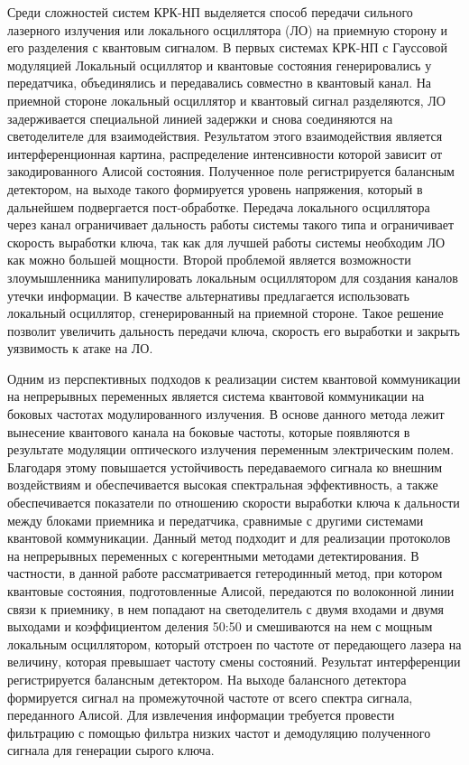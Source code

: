 Среди сложностей систем КРК-НП выделяется способ передачи сильного лазерного излучения или локального осциллятора (ЛО) на приемную сторону и его разделения с квантовым сигналом. В первых системах КРК-НП с Гауссовой модуляцией Локальный осциллятор и квантовые состояния генерировались у передатчика, объединялись и передавались совместно в квантовый канал. На приемной стороне локальный осциллятор и квантовый сигнал разделяются, ЛО задерживается специальной линией задержки и снова соединяются на светоделителе для взаимодействия. Результатом этого взаимодействия является интерференционная картина, распределение интенсивности которой зависит от закодированного Алисой состояния. Полученное поле регистрируется балансным детектором, на выходе такого формируется уровень напряжения, который в дальнейшем подвергается пост-обработке.  Передача локального осциллятора через канал ограничивает дальность работы системы такого типа и ограничивает скорость выработки ключа, так как для лучшей работы системы необходим ЛО как можно большей мощности. Второй проблемой является возможности злоумышленника манипулировать локальным осциллятором для создания каналов утечки информации. В качестве альтернативы предлагается использовать локальный осциллятор, сгенерированный на приемной стороне. Такое решение позволит увеличить дальность передачи ключа, скорость его выработки и закрыть уязвимость к атаке на ЛО.


Одним из перспективных подходов к реализации систем квантовой коммуникации на непрерывных переменных является система квантовой коммуникации на боковых частотах модулированного излучения. В основе данного метода лежит вынесение квантового канала на боковые частоты, которые появляются в результате модуляции оптического излучения переменным электрическим полем. Благодаря этому повышается устойчивость передаваемого сигнала ко внешним воздействиям и обеспечивается высокая спектральная эффективность, а также обеспечивается показатели по отношению скорости выработки ключа к дальности между блоками приемника и передатчика, сравнимые с другими системами квантовой коммуникации. Данный метод подходит и для реализации протоколов на непрерывных переменных с когерентными методами детектирования. В частности, в данной работе рассматривается гетеродинный метод, при котором квантовые состояния, подготовленные Алисой, передаются по волоконной линии связи к приемнику, в нем попадают на светоделитель с двумя входами и двумя выходами и коэффициентом деления 50:50 и смешиваются на нем с мощным локальным осциллятором, который отстроен по частоте от передающего лазера на величину, которая превышает частоту смены состояний. Результат интерференции регистрируется балансным детектором. На выходе балансного детектора формируется сигнал на промежуточной частоте от всего спектра сигнала, переданного Алисой. Для извлечения информации требуется провести фильтрацию с помощью фильтра низких частот и демодуляцию полученного сигнала для генерации сырого ключа. 

